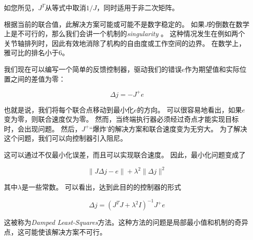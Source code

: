 
如您所见，$ J ^ T $从等式中取消$ 1 / J $，同时适用于非二次矩阵。

根据当前的联合值，此解决方案可能或可能不是数字稳定的。 如果$ J $的倒数在数学上是不可行的，那么我们会讲一个机制的\emph{singularity} 。 这种情况发生在例如两个关节轴排列时，因此有效地消除了机构的自由度或工作空间的边界。 在数学上，雅可比的排名小于6。

我们现在可以编写一个简单的反馈控制器，驱动我们的错误$ e $作为期望值和实际位置之间的差值为零：

\begin{equation}
\Delta{j}=-J^+e
\end{equation}


也就是说，我们将每个联合点移动到最小化$ e $的方向。
可以很容易地看出，如果$ e $变为零，则联合速度仅为零。 然而，当终端执行器必须经过奇点才能实现目标时，会出现问题。 然后，$ J ^ + $``爆炸'的解决方案和联合速度变为无穷大。 为了解决这个问题，我们可以向控制器引入阻尼。

这可以通过不仅最小化误差，而且可以实现联合速度。 因此，最小化问题变成了

\begin{equation}
\|J\Delta j-e\|+\lambda^2\|\Delta j\|^2
\end{equation}


其中$ \lambda $是一些常数。 可以看出，达到此目的的控制器的形式

\begin{equation}
\Delta j=(J^TJ+\lambda^2 I)^{-1}J^+e
\end{equation}


这被称为\emph{Damped Least-Squares}方法。这种方法的问题是局部最小值和机制的奇异点，这可能使该解决方案不可行。

